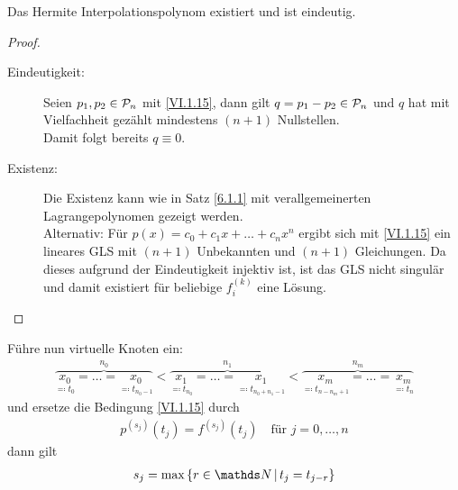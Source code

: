 \begin{Satze}\label{6.1.12}
  Das Hermite Interpolationspolynom existiert und ist eindeutig.

  \begin{proof}~
    \begin{description}
    \item[Eindeutigkeit:] Seien $p_1,p_2\in\mathcal{P}_n$ mit
      \eqref{VI.1.15}, dann gilt $q=p_1-p_2\in\mathcal{P}_n$
      und $q$ hat mit Vielfachheit gezählt mindestens
      $(n+1)$ Nullstellen.\\
      Damit folgt bereits $q\equiv 0$.
    \item[Existenz:] Die Existenz kann wie in Satz \ref{6.1.1}
      mit verallgemeinerten Lagrangepolynomen gezeigt werden.\\
      Alternativ: Für $p(x) = c_0+c_1x+ \dots +c_nx^n$ ergibt sich
      mit \eqref{VI.1.15} ein lineares GLS mit $(n+1)$ Unbekannten
      und $(n+1)$ Gleichungen.
      Da dieses aufgrund der Eindeutigkeit injektiv ist, ist das GLS
      nicht singulär und damit existiert für beliebige $f_i^{(k)}$ eine Lösung.
    \end{description}
  \end{proof}
\end{Satze}


Führe nun virtuelle Knoten ein:
\begin{gather}
  \overbrace{\underset{\eqqcolon t_0}{x_0}
    =\dots
    = \underset{\eqqcolon t_{n_0-1}}{x_0}
  }^{n_0}
  <   \overbrace{\underset{\eqqcolon t_{n_0}}{x_1}=\dots
    = \underset{\eqqcolon t_{n_0+n_1-1}}{x_1}}^{n_1}
  <  \overbrace{\underset{\eqqcolon t_{n-n_m+1}}{x_m}=\dots
    = \underset{\eqqcolon t_{n}}{x_m}}^{n_m}
  \label{VI.1.16}
\end{gather}
und ersetze die Bedingung \eqref{VI.1.15} durch
\begin{gather}
  p^{(s_j)}(t_j) = f^{(s_j)}(t_j) \quad \text{für } j=0,\dots,n
  \label{VI.1.17}
\end{gather}
dann gilt
\begin{gather}
  s_j= \max\left\{ r\in\N\, \middle\vert\, t_j=t_{j-r}\right\}
  \label{VI.1.18}
\end{gather}

